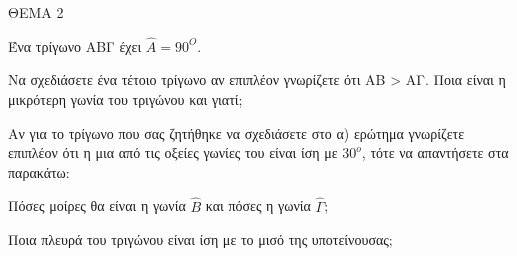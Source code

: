 
ΘΕΜΑ 2

Ένα τρίγωνο ΑΒΓ έχει $\widehat{Α} = 90^{Ο}$.

\begin{alist}
\item Να σχεδιάσετε ένα τέτοιο τρίγωνο αν επιπλέον γνωρίζετε ότι ΑΒ \textgreater{} ΑΓ. Ποια είναι η μικρότερη γωνία του τριγώνου και γιατί; 

\item Αν για το τρίγωνο που σας ζητήθηκε να σχεδιάσετε στο α) ερώτημα γνωρίζετε επιπλέον ότι η μια από τις οξείες γωνίες του είναι ίση με $30^{ο}$, τότε να απαντήσετε στα παρακάτω:

\begin{rlist}
\item Πόσες μοίρες θα είναι η γωνία $\widehat{Β}$ και πόσες η γωνία $\widehat{\Gamma}$; 

\item Ποια πλευρά του τριγώνου είναι ίση με το μισό της υποτείνουσας; 
\end{rlist}
\end{alist}

